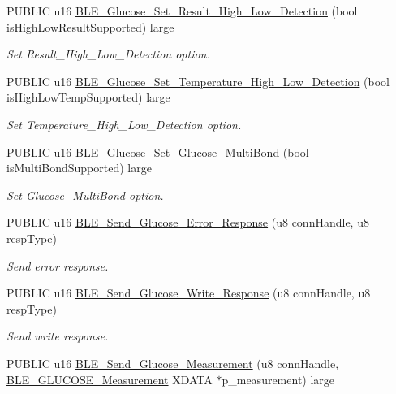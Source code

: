 \begin{DoxyCompactItemize}
P\+U\+B\+L\+IC u16 \hyperlink{group___b_l_e___g_s_gaab90d43e21e6f72d4eec076929a74b90}{B\+L\+E\+\_\+\+Glucose\+\_\+\+Set\+\_\+\+Result\+\_\+\+High\+\_\+\+Low\+\_\+\+Detection} (bool is\+High\+Low\+Result\+Supported) large
\begin{DoxyCompactList}\small\item\em Set Result\+\_\+\+High\+\_\+\+Low\+\_\+\+Detection option. \end{DoxyCompactList}\item 
P\+U\+B\+L\+IC u16 \hyperlink{group___b_l_e___g_s_ga8bd80dbe332d60a634b162ae4e682bf9}{B\+L\+E\+\_\+\+Glucose\+\_\+\+Set\+\_\+\+Temperature\+\_\+\+High\+\_\+\+Low\+\_\+\+Detection} (bool is\+High\+Low\+Temp\+Supported) large
\begin{DoxyCompactList}\small\item\em Set Temperature\+\_\+\+High\+\_\+\+Low\+\_\+\+Detection option. \end{DoxyCompactList}\item 
P\+U\+B\+L\+IC u16 \hyperlink{group___b_l_e___g_s_ga7243726cef55710161f4b827ccf97e90}{B\+L\+E\+\_\+\+Glucose\+\_\+\+Set\+\_\+\+Glucose\+\_\+\+Multi\+Bond} (bool is\+Multi\+Bond\+Supported) large
\begin{DoxyCompactList}\small\item\em Set Glucose\+\_\+\+Multi\+Bond option. \end{DoxyCompactList}\item 
P\+U\+B\+L\+IC u16 \hyperlink{group___b_l_e___g_s_gaa62181d7e8ed7effb5b1068b068e41ce}{B\+L\+E\+\_\+\+Send\+\_\+\+Glucose\+\_\+\+Error\+\_\+\+Response} (u8 conn\+Handle, u8 resp\+Type)
\begin{DoxyCompactList}\small\item\em Send error response. \end{DoxyCompactList}\item 
P\+U\+B\+L\+IC u16 \hyperlink{group___b_l_e___g_s_ga0b2867b8eeca1fd67024b3316e03fc47}{B\+L\+E\+\_\+\+Send\+\_\+\+Glucose\+\_\+\+Write\+\_\+\+Response} (u8 conn\+Handle, u8 resp\+Type)
\begin{DoxyCompactList}\small\item\em Send write response. \end{DoxyCompactList}\item 
P\+U\+B\+L\+IC u16 \hyperlink{group___b_l_e___g_s_ga0e057f83e7a937de4ff9b4cde139693b}{B\+L\+E\+\_\+\+Send\+\_\+\+Glucose\+\_\+\+Measurement} (u8 conn\+Handle, \hyperlink{struct_b_l_e___g_l_u_c_o_s_e___measurement}{B\+L\+E\+\_\+\+G\+L\+U\+C\+O\+S\+E\+\_\+\+Measurement} X\+D\+A\+TA $\ast$p\+\_\+measurement) large

\end{DoxyCompactItemize}
